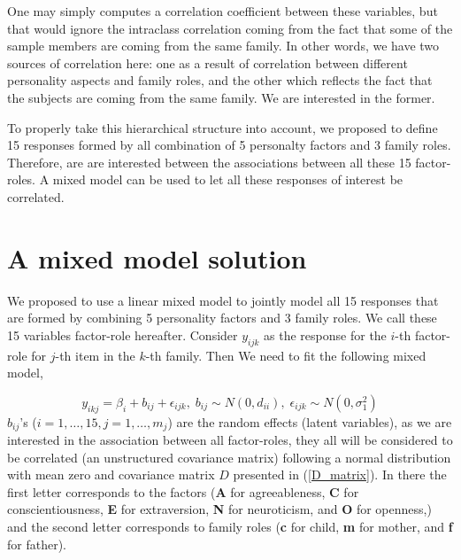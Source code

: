 \documentclass[11pt,a5paper,twoside]{book}
\begin{document}
One may simply computes a correlation coefficient between these variables, but that would ignore the intraclass correlation coming from the fact that some of the sample members are coming from the same family. In other words, we have two sources of correlation here: one as a result of correlation between different personality aspects and family roles, and the other which reflects the fact that the subjects are coming from the same family. We are interested in the former. 

To properly take this hierarchical structure into account, we proposed to define 15 responses formed by all combination of 5 personalty factors and 3 family roles. Therefore, are are interested between the associations between all these 15 factor-roles. A mixed model can be used to let all these responses of interest be correlated.

\section{A mixed model solution}

We proposed to use a linear mixed model to jointly model all 15 responses that are formed by combining 5 personality factors and 3 family roles. We call these 15 variables factor-role hereafter. Consider $y_{ijk}$ as the response for the $i$-th factor-role for $j$-th item in the $k$-th family. Then We need to fit the following mixed model,

\begin{equation}
\label{main_model}
y_{ikj}=\beta_i + b_{ij} + \epsilon_{ijk},\;b_{ij}\sim N(0,d_{ii}),\;\epsilon_{ijk}\sim N(0,\sigma_1^2)
\end{equation}
$b_{ij}$'s ($i=1,\ldots,15, j=1,\ldots,m_j$) are the random effects (latent variables), as we are interested in the association between all factor-roles, they all will be considered to be correlated (an unstructured covariance matrix) following a normal distribution with mean zero and covariance matrix $D$ presented in (\ref{D_matrix}). In there the first letter corresponds to the factors (\textbf{A} for agreeableness, \textbf{C} for conscientiousness, \textbf{E} for extraversion, \textbf{N} for neuroticism, and \textbf{O} for openness,) and the second letter corresponds to family roles (\textbf{c} for child, \textbf{m} for mother, and \textbf{f} for father).
\end{document}
